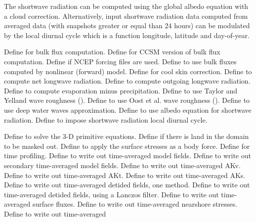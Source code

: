 \begin{klist}
 The shortwave radiation can be computed using the global albedo
 equation with a cloud correction. Alternatively, input shortwave
 radiation data computed from averaged data (with snapshots greater
 or equal than 24 hours) can be modulated by the local diurnal
 cycle which is a function longitude, latitude and day-of-year.
  \begin{klist}
     Define for bulk flux computation.
     Define for CCSM version of bulk flux computation.
     Define if NCEP forcing files are used.
     Define to use bulk fluxes computed by
  nonlinear (forward) model.
     Define for cool skin correction.
     Define to compute net longwave radiation.
     Define to compute outgoing longwave radiation.
     Define to compute evaporation minus precipitation.
     Define to use Taylor and Yelland wave
  roughness (\cite{Taylor_2001}).
     Define to use Oost et al. wave
  roughness (\cite{Oost_2002}).
     Define to use deep water waves approximation.
     Define to use albedo equation for shortwave radiation.
     Define to impose shortwave radiation local
  diurnal cycle.
  \end{klist}
   \mbox{}
  \begin{klist}
         Define to solve the 3-D primitive
  equations.
       Define if there is land in the domain to be
   masked out.
       Define to apply the surface
  stresses as a body force.
         Define for time profiling.
        Define to write out time-averaged
  model fields.
       Define to write out secondary time-averaged
  model fields.
        Define to write out time-averaged AKv.
        Define to write out time-averaged AKt.
        Define to write out time-averaged AKs.
        Define to write out time-averaged
  detided fields, one method.
        Define to write out time-averaged
  detided fields, using a Lanczos filter.
        Define to write out time-averaged
  surface fluxes.
        Define to write out time-averaged
  nearshore stresses.
        Define to write out time-averaged

\end{klist}
\end{klist}

